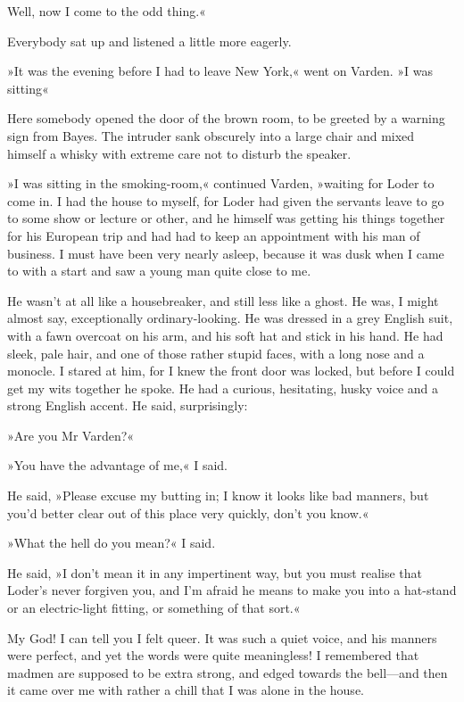 Well, now I come to the odd thing.«

Everybody sat up and listened a little more eagerly.

»It was the evening before I had to leave New York,« went on Varden. »I was sitting\longdash«

Here somebody opened the door of the brown room, to be greeted by a warning sign from Bayes. The intruder sank obscurely into a large chair and mixed himself a whisky with extreme care not to disturb the speaker.

»I was sitting in the smoking-room,« continued Varden, »waiting for Loder to come in. I had the house to myself, for Loder had given the servants leave to go to some show or lecture or other, and he himself was getting his things together for his European trip and had had to keep an appointment with his man of business. I must have been very nearly asleep, because it was dusk when I came to with a start and saw a young man quite close to me.

He wasn't at all like a housebreaker, and still less like a ghost. He was, I might almost say, exceptionally ordinary-looking. He was dressed in a grey English suit, with a fawn overcoat on his arm, and his soft hat and stick in his hand. He had sleek, pale hair, and one of those rather stupid faces, with a long nose and a monocle. I stared at him, for I knew the front door was locked, but before I could get my wits together he spoke. He had a curious, hesitating, husky voice and a strong English accent. He said, surprisingly:

»Are you Mr Varden?«

»You have the advantage of me,« I said.

He said, »Please excuse my butting in; I know it looks like bad manners, but you'd better clear out of this place very quickly, don't you know.«

»What the hell do you mean?« I said.

He said, »I don't mean it in any impertinent way, but you must realise that Loder's never forgiven you, and I'm afraid he means to make you into a hat-stand or an electric-light fitting, or something of that sort.«

My God! I can tell you I felt queer. It was such a quiet voice, and his manners were perfect, and yet the words were quite meaningless! I remembered that madmen are supposed to be extra strong, and edged towards the bell—and then it came over me with rather a chill that I was alone in the house.

